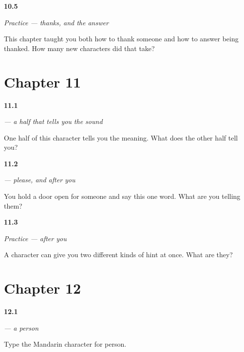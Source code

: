 \noindent\begin{minipage}[t]{\linewidth}
\raggedright
\hypertarget{review-ZH-C10-practice-cost}{\textbf{10.5}} \emph{Practice — thanks, and the answer}\par
\small This chapter taught you both how to thank someone and how to answer being thanked. How many new characters did that take?
\end{minipage}\par\medskip

\section*{Chapter 11}

\noindent\begin{minipage}[t]{\linewidth}
\raggedright
\hypertarget{review-ZH-W11-qing-halves}{\textbf{11.1}} \emph{ — a half that tells you the sound}\par
\small One half of this character tells you the meaning. What does the other half tell you?
\end{minipage}\par\medskip

\noindent\begin{minipage}[t]{\linewidth}
\raggedright
\hypertarget{review-ZH-C11-qing-alone}{\textbf{11.2}} \emph{ — please, and after you}\par
\small You hold a door open for someone and say this one word. What are you telling them?
\end{minipage}\par\medskip

\noindent\begin{minipage}[t]{\linewidth}
\raggedright
\hypertarget{review-ZH-C11-practice-halves}{\textbf{11.3}} \emph{Practice — after you}\par
\small A character can give you two different kinds of hint at once. What are they?
\end{minipage}\par\medskip

\section*{Chapter 12}

\noindent\begin{minipage}[t]{\linewidth}
\raggedright
\hypertarget{review-ZH-C12-ren-meaning}{\textbf{12.1}} \emph{ — a person}\par
\small Type the Mandarin character for person.
\end{minipage}\par\medskip

